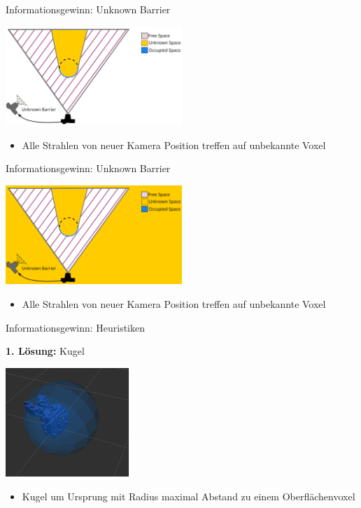\documentclass[aspectratio=169]{beamer}
\begin{document}
\begin{frame}{Informationsgewinn: Unknown Barrier}
	\begin{block}{}
		\begin{center}
			\includegraphics[width=0.5\textwidth]{Graphics/unknown_barrier_vscott_1.png}
		\end{center}
		\begin{itemize}
			\item Alle Strahlen von neuer Kamera Position treffen auf unbekannte Voxel
		\end{itemize}
	\end{block}
\end{frame}

\begin{frame}{Informationsgewinn: Unknown Barrier}
	\begin{block}{}
		\begin{center}
			\includegraphics[width=0.5\textwidth]{Graphics/unknown_barrier_vscott_2.png}
		\end{center}
		\begin{itemize}
			\item Alle Strahlen von neuer Kamera Position treffen auf unbekannte Voxel
		\end{itemize}
	\end{block}
\end{frame}

\begin{frame}{Informationsgewinn: Heuristiken}
	\begin{block}{\textbf{1. Lösung:} Kugel}
		\begin{center}
			\includegraphics[width=0.35\textwidth]{Graphics/sphere.png}
		\end{center}
		\begin{itemize}
			\item  Kugel um Ursprung mit Radius maximal Abstand zu einem Oberflächenvoxel
		\end{itemize}
	\end{block}
\end{frame}
\end{document}
